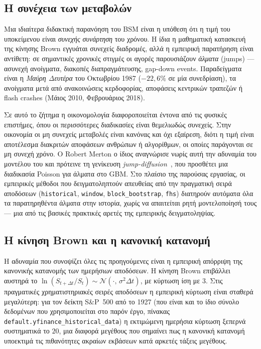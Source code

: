 \documentclass[12pt]{article}
\begin{document}
\subsection{Η συνέχεια των μεταβολών}

Μια ιδιαίτερα διδακτική παρανόηση του BSM είναι η υπόθεση ότι η τιμή του υποκείμενου είναι \emph{συνεχής συνάρτηση} του χρόνου. Η ίδια η μαθηματική κατασκευή της κίνησης Brown εγγυάται συνεχείς διαδρομές, αλλά η εμπειρική παρατήρηση είναι αντίθετη: σε σημαντικές χρονικές στιγμές οι αγορές παρουσιάζουν \emph{άλματα} (jumps) — ασυνεχή ανοίγματα, διακοπές διαπραγμάτευσης, gap-down events. Παραδείγματα είναι η \emph{Μαύρη Δευτέρα} του Οκτωβρίου 1987 ($-22{,}6\%$ σε μία συνεδρίαση), τα ανοίγματα μετά από ανακοινώσεις κερδοφορίας, αποφάσεις κεντρικών τραπεζών ή flash crashes (Μάιος 2010, Φεβρουάριος 2018).

Σε αυτό το ζήτημα η οικονομολογία διαφοροποιείται έντονα από τις φυσικές επιστήμες, όπου οι περισσότερες διαδικασίες είναι θεμελιωδώς συνεχείς. Στην οικονομία οι μη συνεχείς μεταβολές είναι κανόνας και όχι εξαίρεση, διότι η τιμή είναι αποτέλεσμα διακριτών αποφάσεων ανθρώπων ή αλγορίθμων, οι οποίες παράγονται σε μη συνεχή χρόνο. Ο Robert Merton ο ίδιος αναγνώρισε νωρίς αυτή την αδυναμία του μοντέλου του και πρότεινε τη γενίκευση \emph{jump-diffusion}~\cite{Merton1976}, που προσθέτει μια διαδικασία Poisson για άλματα στο GBM. Στο πλαίσιο της παρούσας εργασίας, οι εμπειρικές μέθοδοι που δειγματοληπτούν απευθείας από την πραγματική σειρά αποδόσεων (\texttt{historical}, \texttt{window}, \texttt{block\_bootstrap}, \texttt{fhs}) διατηρούν αυτόματα όλα τα παρατηρηθέντα άλματα στην ιστορία, χωρίς να απαιτείται ρητή μοντελοποίησή τους — μια από τις βασικές πρακτικές αρετές της εμπειρικής δειγματοληψίας.

\subsection{Η κίνηση Brown και η κανονική κατανομή}

Η αδυναμία που συνοψίζει όλες τις προηγούμενες είναι η εμπειρική απόρριψη της κανονικής κατανομής των ημερήσιων αποδόσεων. Η κίνηση Brown επιβάλλει αυστηρά το $\ln(S_{t+\Delta t}/S_t) \sim \mathcal{N}(\cdot,\, \sigma^2 \Delta t)$, με κύρτωση ίση με $3$. Στις πραγματικές χρηματιστηριακές σειρές αποδόσεων η εμπειρική κύρτωση είναι σταθερά μεγαλύτερη: για τον δείκτη S\&P~500 από το 1927 (που είναι και το ίδιο σύνολο δεδομένων που χρησιμοποιείται στο παρόν έργο, πίνακας \texttt{default.yfinance\_historical\_data}) η εκτιμώμενη ημερήσια κύρτωση ξεπερνά συστηματικά το $20$, μια διαφορά μεγέθους που σημαίνει πως η κανονική κατανομή υποεκτιμά τις πιθανότητες ακραίων εκβάσεων κατά αρκετές τάξεις μεγέθους.
\end{document}
